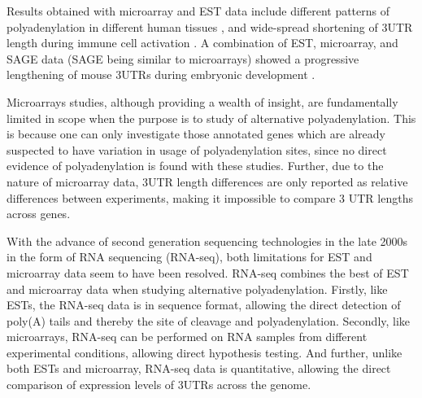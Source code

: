 Results obtained with microarray and EST data include different patterns of
polyadenylation in different human tissues \cite{zhang_biased_2005}, and
wide-spread shortening of 3\p UTR length during immune cell activation
\cite{sandberg_proliferating_2008}. A combination of EST, microarray, and SAGE
data (SAGE being similar to microarrays) showed a progressive lengthening of
mouse 3\p UTRs during embryonic development \cite{ji_progressive_2009}.

Microarrays studies, although providing a wealth of insight, are fundamentally
limited in scope when the purpose is to study of alternative polyadenylation.
This is because one can only investigate those annotated genes which are
already suspected to have variation in usage of polyadenylation sites, since no
direct evidence of polyadenylation is found with these studies. Further, due to
the nature of microarray data, 3\p UTR length differences are only reported as
relative differences between experiments, making it impossible to compare 3\p
UTR lengths across genes.

With the advance of second generation sequencing technologies in the late 2000s
in the form of RNA sequencing (RNA-seq), both limitations for EST and
microarray data seem to have been resolved. RNA-seq combines the best of EST
and microarray data when studying alternative polyadenylation. Firstly, like
ESTs, the RNA-seq data is in sequence format, allowing the direct detection
of poly(A) tails and thereby the site of cleavage and polyadenylation.
Secondly, like microarrays, RNA-seq can be performed on RNA samples from
different experimental conditions, allowing direct hypothesis testing. And
further, unlike both ESTs and microarray, RNA-seq data is quantitative,
allowing the direct comparison of expression levels of 3\p UTRs across the
genome.

